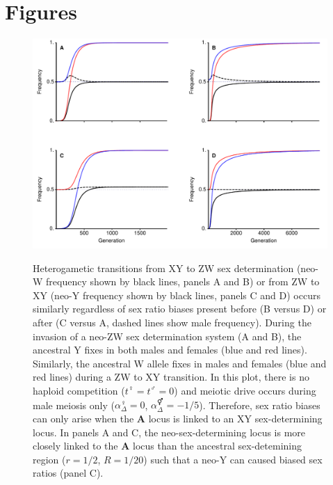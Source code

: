 \documentclass[12pt]{article}
\begin{document}



\newpage
\section*{Figures}
\newpage

\begin{figure}
\centering
\includegraphics[width=\linewidth]{Combination_Turnover}\\
\caption{
Heterogametic transitions from XY to ZW sex determination (neo-W frequency shown by black lines, panels A and B) or from ZW to XY (neo-Y frequency shown by black lines, panels C and D) occurs similarly regardless of sex ratio biases present before (B versus D) or after (C versus A, dashed lines show male frequency). 
During the invasion of a neo-ZW sex determination system (A and B), the ancestral Y fixes in both males and females (blue and red lines). 
Similarly, the ancestral W allele fixes in males and females (blue and red lines) during a ZW to XY transition. 
In this plot, there is no haploid competition ($t^\female=t^\male=0$) and meiotic drive occurs during male meiosis only ($\alpha^\female_{\Delta}=0$, $\alpha^\Hermaphrodite_{\Delta}=-1/5$). Therefore, sex ratio biases can only arise when the \textbf{A} locus is linked to an XY sex-determining locus.
In panels A and C, the neo-sex-determining locus is more closely linked to the \textbf{A} locus than the ancestral sex-detemining region ($r=1/2$, $R=1/20$) such that a neo-Y can caused biased sex ratios (panel C). 
}
\end{figure}
\end{document}
